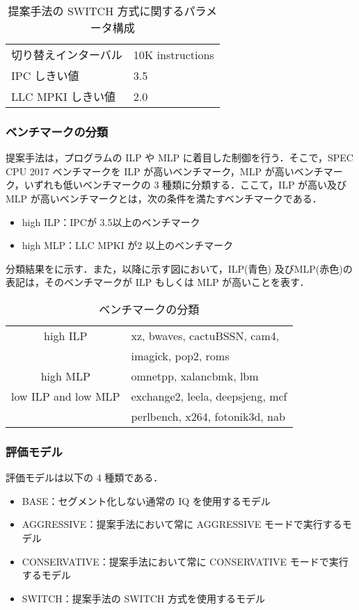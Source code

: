 \begin{table}[tb]
  \caption{提案手法の SWITCH 方式に関するパラメータ構成}
  \footnotesize
  \center
    \begin{tabular}{l|l} \hline \hline
    切り替えインターバル & 10K instructions \\
    IPC しきい値 & 3.5 \\
    LLC MPKI しきい値 & 2.0 \\ \hline 
  \end{tabular}
  \label{tab:switch_config}
\end{table}

\subsubsection{ベンチマークの分類}
提案手法は，プログラムの ILP や MLP に着目した制御を行う．そこで，SPEC CPU 2017 ベンチマークを ILP が高いベンチマーク，MLP が高いベンチマーク，いずれも低いベンチマークの 3 種類に分類する．ここて，ILP が高い及びMLP が高いベンチマークとは，次の条件を満たすベンチマークである．
\begin{itemize}
  \item high ILP：IPCが 3.5以上のベンチマーク
  \item high MLP：LLC MPKI が2 以上のベンチマーク
\end{itemize}

分類結果をに示す．また，以降に示す図において，ILP(青色) 及びMLP(赤色)の表記は，そのベンチマークが ILP もしくは MLP が高いことを表す．
\begin{table}[htb]
  \caption{ベンチマークの分類}
  \footnotesize
  \center
    \begin{tabular}{c|l} \hline \hline
    high ILP & xz, bwaves, cactuBSSN, cam4, \\
             & imagick, pop2, roms\\ \hline
    high MLP &  omnetpp, xalancbmk, lbm\\ \hline
    low ILP and low MLP & exchange2, leela, deepsjeng, mcf\\
                        & perlbench, x264, fotonik3d, nab \\ \hline
  \end{tabular}
  \label{tab:classification}
\end{table}

\subsubsection{評価モデル}
評価モデルは以下の 4 種類である．
\begin{itemize}
  \item BASE：セグメント化しない通常の IQ を使用するモデル
  \item AGGRESSIVE：提案手法において常に AGGRESSIVE モードで実行するモデル
  \item CONSERVATIVE：提案手法において常に CONSERVATIVE モードで実行するモデル
  \item SWITCH：提案手法の SWITCH 方式を使用するモデル 
\end{itemize}

